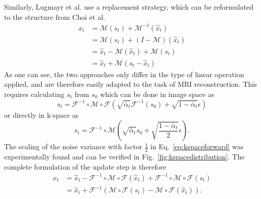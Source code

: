 Similarly, Lugmayr et al. use a replacement strategy, which can be reformulated to the structure from Choi et al.
\begin{align}
    \label{eq:repaint}
    x_{t} & = \mathcal{M}(s_t) + \mathcal{M}^{-1}(\hat{x}_t)        \\
          & = \mathcal{M}(s_t) + (I - \mathcal{M})(\hat{x}_t)       \\
          & = \hat{x}_t - \mathcal{M}(\hat{x}_t) + \mathcal{M}(s_t) \\
          & = \hat{x}_t + \mathcal{M}(s_t - \hat{x}_t)
\end{align}
As one can see, the two approaches only differ in the type of linear operation applied, and are therefore easily adapted to the task of MRI reconstruction. This requires calculating $s_t$ from $s_0$ which can be done in image space as
\begin{equation}
    s_t = \mathcal{F}^{-1} \circ \mathcal{M} \circ \mathcal{F} (\sqrt{\bar{\alpha}_t} \mathcal{F}^{-1}(s_0) + \sqrt{1-\bar{\alpha}_t} \epsilon)
\end{equation}
or directly in k-space as
\begin{equation}
    \label{eq:kspaceforward}
    s_t = \mathcal{F}^{-1} \circ \mathcal{M} (\sqrt{\bar{\alpha}_t} s_0 + \sqrt{\frac{1-\bar{\alpha}_t}{2}} \epsilon).
\end{equation}
The scaling of the noise variance with factor $\frac{1}{2}$ in Eq.~\ref{eq:kspaceforward} was experimentally found and can be verified in Fig.~\ref{fig:kspacedistribution}. The complete formulation of the update step is therefore
\begin{align}
    x_{t} & = \hat{x}_t - \mathcal{F}^{-1}\circ\mathcal{M}\circ\mathcal{F}(\hat{x}_t) + \mathcal{F}^{-1} \circ \mathcal{M} \circ \mathcal{F} (s_t) \\
          & = \hat{x}_t + \mathcal{F}^{-1}\left(\mathcal{M} \circ \mathcal{F} (s_t) - \mathcal{M}\circ\mathcal{F}(\hat{x}_t)\right).
\end{align}

